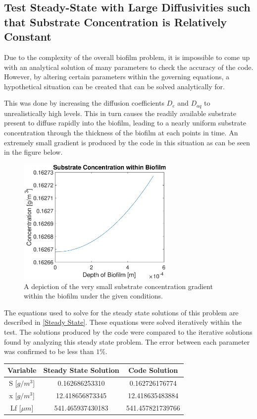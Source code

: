 \documentclass[letterpaper, twoside]{article}
\numberwithin{equation}{section}
\begin{document}
\subsection{Test Steady-State with Large Diffusivities such that Substrate Concentration is Relatively Constant}

Due to the complexity of the overall biofilm problem, it is impossible to come up with an analytical solution of many parameters to check the accuracy of the code. However, by altering certain parameters within the governing equations, a hypothetical situation can be created that can be solved analytically for.

This was done by increasing the diffusion coefficients $D_e$ and $D_{aq}$ to unrealistically high levels. This in turn causes the readily available substrate present to diffuse rapidly into the biofilm, leading to a nearly uniform substrate concentration through the thickness of the biofilm at each points in time. An extremely small gradient is produced by the code in this situation as can be seen in the figure below.

\begin{figure}[H]
  \centering
  \includegraphics[read=eps, width=3in]{SteadyState_Figure1.eps}
  \caption{A depiction of the very small substrate concentration gradient within the biofilm under the given conditions.}
\end{figure}

The equations used to solve for the steady state solutions of this problem are described in \ref{Steady State}. These equations were solved iteratively within the test. The solutions produced by the code were compared to the iterative solutions found by analyzing this steady state problem. The error between each parameter was confirmed to be less than $1\%$.

\begin{center}
\begin{tabular}{ | c | c | c | } 
\hline
 \textbf{Variable} & \textbf{Steady State Solution} & \textbf{Code Solution} \\ 
 \hline
 S [{$g/m^3$}]  & 0.162686253310 & 0.162726176774 \\ 
 \hline
 x  [{$g/m^3$}] & 12.418656873345 & 12.418635483884 \\
 \hline
 Lf  [{$\mu m$}] & 541.465937430183 & 541.457821739766 \\
\hline
\end{tabular}
\end{center}
\end{document}
